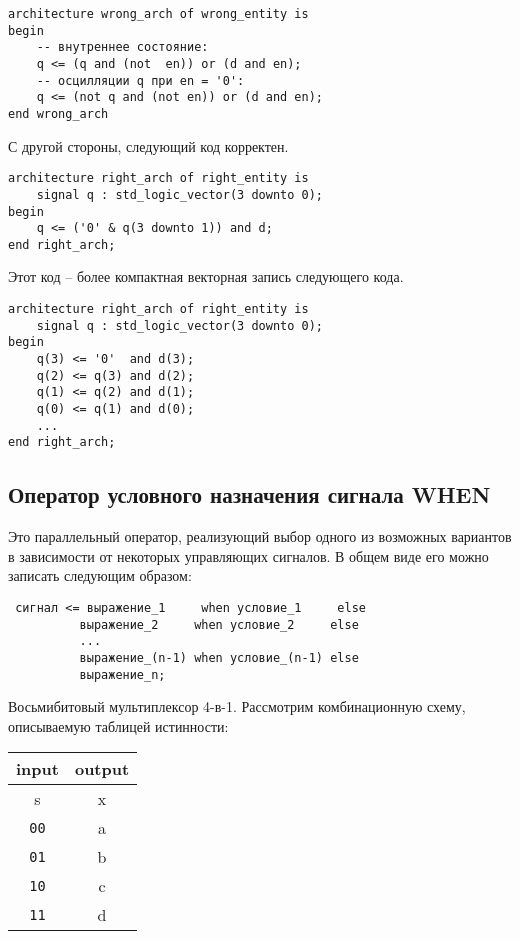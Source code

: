 \begin{Code}
\begin{lstlisting}
architecture wrong_arch of wrong_entity is
begin
    -- внутреннее состояние:
    q <= (q and (not  en)) or (d and en);
    -- осцилляции q при en = '0':
    q <= (not q and (not en)) or (d and en);
end wrong_arch
\end{lstlisting}
\end{Code}
С другой стороны, следующий код корректен.
\begin{Code}
\begin{lstlisting}
architecture right_arch of right_entity is
    signal q : std_logic_vector(3 downto 0);
begin
    q <= ('0' & q(3 downto 1)) and d;
end right_arch;
\end{lstlisting}
\end{Code}

Этот код – более компактная векторная запись следующего кода.

\begin{Code}
\begin{lstlisting}
architecture right_arch of right_entity is
    signal q : std_logic_vector(3 downto 0);
begin
    q(3) <= '0'  and d(3);
    q(2) <= q(3) and d(2);
    q(1) <= q(2) and d(1);
    q(0) <= q(1) and d(0);
    ...
end right_arch;
\end{lstlisting}
\end{Code}

\subsection{Оператор условного назначения сигнала WHEN}
Это параллельный оператор, реализующий выбор одного из возможных вариантов в зависимости от некоторых управляющих сигналов. В общем виде его можно записать следующим образом:
\begin{Code}
\begin{lstlisting}
 сигнал <= выражение_1     when условие_1     else 
          выражение_2     when условие_2     else 
          ...
          выражение_(n-1) when условие_(n-1) else 
          выражение_n;
\end{lstlisting}
\end{Code}
 Восьмибитовый мультиплексор 4-в-1.
Рассмотрим комбинационную схему, описываемую таблицей истинности:
\begin{table}[h]
\centering
\begin{tabular}{|c|c|}
\hline
input       & output \\ \hline
s           & x      \\ \hline
\texttt{00} & a      \\
\texttt{01} & b      \\
\texttt{10} & c      \\
\texttt{11} & d      \\
\hline
\end{tabular}
\end{table}

